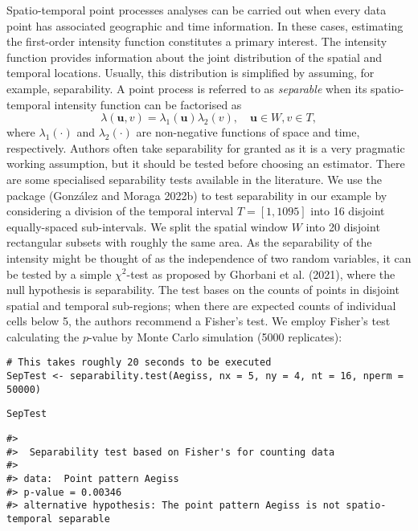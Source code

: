 Spatio-temporal point processes analyses can be carried out when every data point has associated geographic and time information. In these cases, estimating the first-order intensity function constitutes a primary interest. The intensity function provides information about the joint distribution of the spatial and temporal locations. Usually, this distribution is simplified by assuming, for example, separability. A point process is referred to as \textit{separable} when its spatio-temporal intensity function can be factorised as
\[
    \lambda(\mathbf{u},v) = \lambda_1(\mathbf{u}) \lambda_2(v), \quad  \mathbf{u} \in W,v \in T,
\]
where \(\lambda_1(\cdot)\) and \(\lambda_2(\cdot)\) are non-negative functions of space and time, respectively. Authors often take separability for granted as it is a very pragmatic working assumption, but it should be tested before choosing an estimator. There are some specialised separability tests available in the literature. We use the package  (González and Moraga 2022b) to test separability in our example by considering a division of the temporal interval \(T=[1,1095]\) into 16 disjoint equally-spaced sub-intervals. We split the spatial window \(W\) into 20 disjoint rectangular subsets with roughly the same area. As the separability of the intensity might be thought of as the independence of two random variables, it can be tested by a simple \(\chi^2\)-test as proposed by Ghorbani et al. (2021), where the null hypothesis is separability. The test bases on the counts of points in disjoint spatial and temporal sub-regions; when there are expected counts of individual cells below 5, the authors recommend a Fisher's test. We employ Fisher's test calculating the \(p\)-value by Monte Carlo simulation (5000 replicates):

\begin{verbatim}
# This takes roughly 20 seconds to be executed 
SepTest <- separability.test(Aegiss, nx = 5, ny = 4, nt = 16, nperm = 50000)
\end{verbatim}

\begin{verbatim}
SepTest
\end{verbatim}

\begin{verbatim}
#> 
#>  Separability test based on Fisher's for counting data
#> 
#> data:  Point pattern Aegiss
#> p-value = 0.00346
#> alternative hypothesis: The point pattern Aegiss is not spatio-temporal separable
\end{verbatim}

